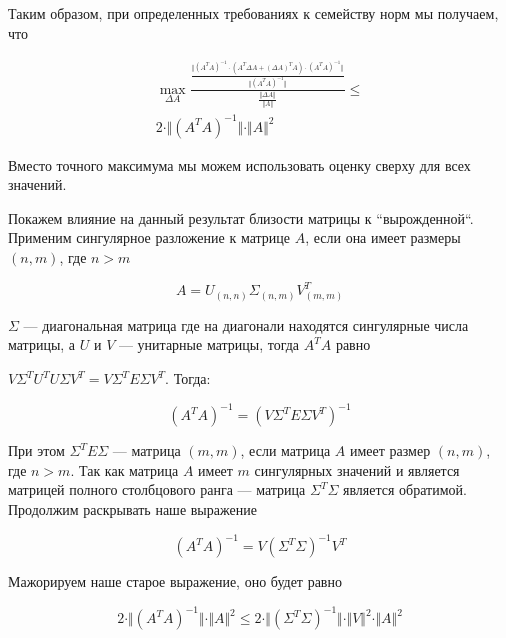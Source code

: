 \documentclass{article}
\begin{document}
    Таким образом, при определенных требованиях к семейству норм мы получаем, что

    \[
        \begin{gathered}
            \max_{\Delta A} \frac{ \frac{\Vert  (A^{T} A)^{-1} \cdot (A^{T} \Delta A + (\Delta A)^{T} A) \cdot (A^{T} A)^{-1} \Vert }{\Vert (A^T A)^{-1} \Vert} }{ \frac{\Vert \Delta A \Vert}{\Vert A \Vert} } \leq \\
            2 \cdot \Vert (A^{T} A)^{-1} \Vert \cdot \Vert A \Vert^{2}
        \end{gathered}
    \]

    Вместо точного максимума мы можем использовать оценку сверху для всех значений.

    Покажем влияние на данный результат близости матрицы к ``вырожденной``.
    Применим сингулярное разложение к матрице $A$, если она имеет размеры $(n, m)$, где $n > m$

    \begin{equation}
        A = U_{(n, n)} \Sigma_{(n, m)} V^{T}_{(m, m)}
    \end{equation}

    $\Sigma$ --- диагональная матрица где на диагонали находятся сингулярные числа матрицы, а $U$ и $V$ --- унитарные матрицы, тогда
    $A^{T}A$ равно

    $V \Sigma^{T} U^{T}  U \Sigma V^{T} = V \Sigma^{T} E \Sigma V^{T}$.
    Тогда:

    \begin{equation}
    (A^{T}A)^{-1} = (V \Sigma^{T} E \Sigma V^{T})^{-1}
    \end{equation}

    При этом $\Sigma^{T} E \Sigma $ --- матрица $(m, m)$, если матрица $A$ имеет размер $(n, m)$, где $n > m$.
    Так как матрица $A$ имеет $m$ сингулярных значений и является матрицей полного столбцового ранга ---
    матрица $\Sigma^{T} \Sigma$ является обратимой.
    Продолжим раскрывать наше выражение

    \begin{equation}
        (A^{T}A)^{-1} = V (\Sigma^{T} \Sigma)^{-1} V^{T}
    \end{equation}

    Мажорируем наше старое выражение, оно будет равно

    \begin{equation}
        2 \cdot \Vert (A^{T} A)^{-1} \Vert \cdot \Vert A \Vert^{2} \leq 2 \cdot \Vert (\Sigma^{T} \Sigma)^{-1} \Vert \cdot \Vert V \Vert^{2} \cdot \Vert A \Vert^{2}
    \end{equation}
\end{document}
